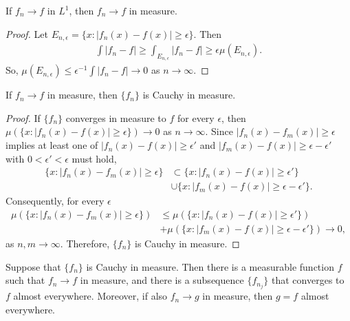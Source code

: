 \begin{proposition}
    If $f_n \to f$ in $L^1$, then $f_n \to f$ in measure.
\end{proposition}

\begin{proof}
    Let $E_{n,\epsilon} = \{ x: |f_n(x) - f(x)| \ge \epsilon \}$.
    Then
    \begin{align}
        \int |f_n - f| \ge \int_{E_{n,\epsilon}} |f_n - f| \ge \epsilon \mu(E_{n,\epsilon}).
    \end{align}
    So, $\mu(E_{n,\epsilon}) \le \epsilon^{-1} \int |f_n - f| \to 0$ as $n \to \infty$.
\end{proof}

\begin{proposition}
    If $f_n \to f$ in measure, then $\{ f_n \}$ is Cauchy in measure. 
\end{proposition}

\begin{proof}
    If $\{ f_n \}$ converges in measure to $f$ for every $\epsilon$, then $\mu(\{ x: |f_n(x) - f(x)| \ge \epsilon \}) \to 0$ as $n \to \infty$.
    Since $|f_n(x) - f_m(x)| \ge \epsilon$ implies at least one of $|f_n(x) - f(x)| \ge \epsilon'$ and $|f_m(x) - f(x)| \ge \epsilon - \epsilon'$ with $0 < \epsilon' < \epsilon$ must hold, 
    \begin{align}
        \{ x: |f_n(x) - f_m(x)| \ge \epsilon \} & \subset \{ x: |f_n(x) - f(x)| \ge \epsilon' \} \\
        & \cup \{ x: |f_m(x) - f(x)| \ge \epsilon - \epsilon' \}. \nonumber
    \end{align}
    Consequently, for every $\epsilon$
    \begin{align}
        \mu(\{ x: |f_n(x) - f_m(x)| \ge \epsilon \}) & \le \mu(\{ x: |f_n(x) - f(x)| \ge \epsilon' \}) \\
        & + \mu(\{ x: |f_m(x) - f(x)| \ge \epsilon - \epsilon' \}) \to 0, \nonumber
    \end{align}
    as $n, m \to \infty$.
    Therefore, $\{ f_n \}$ is Cauchy in measure.
\end{proof}

\begin{theorem}
    Suppose that $\{ f_n \}$ is Cauchy in measure.
    Then there is a measurable function $f$ such that $f_n \to f$ in measure, and there is a subsequence $\{ f_{n_j} \}$ that converges to $f$ almost everywhere.
    Moreover, if also $f_n \to g$ in measure, then $g = f$ almost everywhere.
\end{theorem}

